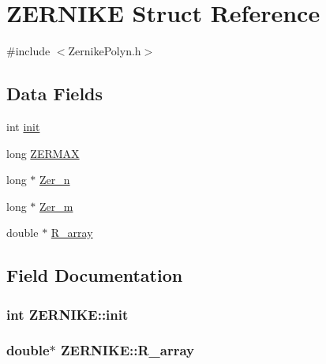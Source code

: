 \hypertarget{structZERNIKE}{}\section{Z\+E\+R\+N\+I\+K\+E Struct Reference}
\label{structZERNIKE}


{\ttfamily \#include $<$Zernike\+Polyn.\+h$>$}

\subsection*{Data Fields}
\begin{DoxyCompactItemize}
\item 
int \hyperlink{structZERNIKE_aac9ea666bbfdae8b71b4bff01617b2c2}{init}
\item 
long \hyperlink{structZERNIKE_a2c37fde142f459b1374da2472151ee29}{Z\+E\+R\+M\+A\+X}
\item 
long $\ast$ \hyperlink{structZERNIKE_a9c1c566a6926ec5c5458614732c6d358}{Zer\+\_\+n}
\item 
long $\ast$ \hyperlink{structZERNIKE_a92c691d4081cb095e8f006335bf20f08}{Zer\+\_\+m}
\item 
double $\ast$ \hyperlink{structZERNIKE_ab54550ba1f67c3f7d31c9079dace1aa8}{R\+\_\+array}
\end{DoxyCompactItemize}


\subsection{Field Documentation}
\hypertarget{structZERNIKE_aac9ea666bbfdae8b71b4bff01617b2c2}{}
\subsubsection[{init}]{\setlength{\rightskip}{0pt plus 5cm}int Z\+E\+R\+N\+I\+K\+E\+::init}\label{structZERNIKE_aac9ea666bbfdae8b71b4bff01617b2c2}
\hypertarget{structZERNIKE_ab54550ba1f67c3f7d31c9079dace1aa8}{}
\subsubsection[{R\+\_\+array}]{\setlength{\rightskip}{0pt plus 5cm}double$\ast$ Z\+E\+R\+N\+I\+K\+E\+::\+R\+\_\+array}\label{structZERNIKE_ab54550ba1f67c3f7d31c9079dace1aa8}
\hypertarget{structZERNIKE_a92c691d4081cb095e8f006335bf20f08}{}
